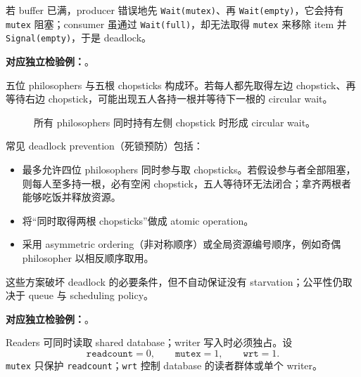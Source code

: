 
若 buffer 已满，producer 错误地先 \texttt{Wait(mutex)}、再 \texttt{Wait(empty)}，它会持有 \texttt{mutex} 阻塞；consumer 虽通过 \texttt{Wait(full)}，却无法取得 \texttt{mutex} 来移除 item 并 \texttt{Signal(empty)}，于是 deadlock。

\textbf{对应独立检验例：}。


五位 philosophers 与五根 chopsticks 构成环。若每人都先取得左边 chopstick、再等待右边 chopstick，可能出现五人各持一根并等待下一根的 circular wait。

\begin{figure}[htbp]
  \centering
  
  \caption{所有 philosophers 同时持有左侧 chopstick 时形成 circular wait。}
  \label{fig:sc2005-l10-dining-philosophers}
\end{figure}

常见 deadlock prevention（死锁预防）包括：
\begin{itemize}
  \item 最多允许四位 philosophers 同时参与取 chopsticks。若假设参与者全部阻塞，则每人至多持一根，必有空闲 chopstick，五人等待环无法闭合；拿齐两根者能够吃饭并释放资源。
  \item 将“同时取得两根 chopsticks”做成 atomic operation。
  \item 采用 asymmetric ordering（非对称顺序）或全局资源编号顺序，例如奇偶 philosopher 以相反顺序取用。
\end{itemize}
这些方案破坏 deadlock 的必要条件，但不自动保证没有 starvation；公平性仍取决于 queue 与 scheduling policy。

\textbf{对应独立检验例：}。


Readers 可同时读取 shared database；writer 写入时必须独占。设
\[
  \texttt{readcount}=0,\qquad \texttt{mutex}=1,\qquad \texttt{wrt}=1.
\]
\texttt{mutex} 只保护 \texttt{readcount}；\texttt{wrt} 控制 database 的读者群体或单个 writer。

